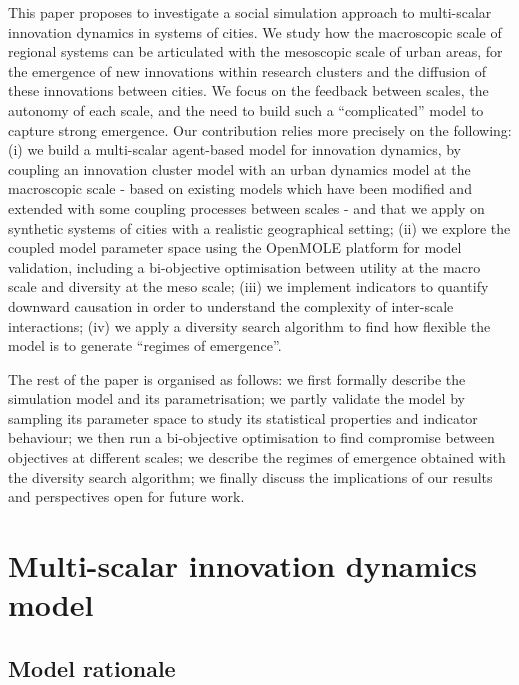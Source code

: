 \documentclass[letterpaper]{article}
\begin{document}
This paper proposes to investigate a social simulation approach to multi-scalar innovation dynamics in systems of cities. We study how the macroscopic scale of regional systems can be articulated with the mesoscopic scale of urban areas, for the emergence of new innovations within research clusters and the diffusion of these innovations between cities. We focus on the feedback between scales, the autonomy of each scale, and the need to build such a ``complicated'' model to capture strong emergence. Our contribution relies more precisely on the following: (i) we build a multi-scalar agent-based model for innovation dynamics, by coupling an innovation cluster model with an urban dynamics model at the macroscopic scale - based on existing models which have been modified and extended with some coupling processes between scales - and that we apply on synthetic systems of cities with a realistic geographical setting; (ii) we explore the coupled model parameter space using the OpenMOLE platform for model validation, including a bi-objective optimisation between utility at the macro scale and diversity at the meso scale; (iii) we implement indicators to quantify downward causation in order to understand the complexity of inter-scale interactions; (iv) we apply a diversity search algorithm to find how flexible the model is to generate ``regimes of emergence''.

The rest of the paper is organised as follows: we first formally describe the simulation model and its parametrisation; we partly validate the model by sampling its parameter space to study its statistical properties and indicator behaviour; we then run a bi-objective optimisation to find compromise between objectives at different scales; we describe the regimes of emergence obtained with the diversity search algorithm; we finally discuss the implications of our results and perspectives open for future work.


\section{Multi-scalar innovation dynamics model}

\subsection{Model rationale}
\end{document}
